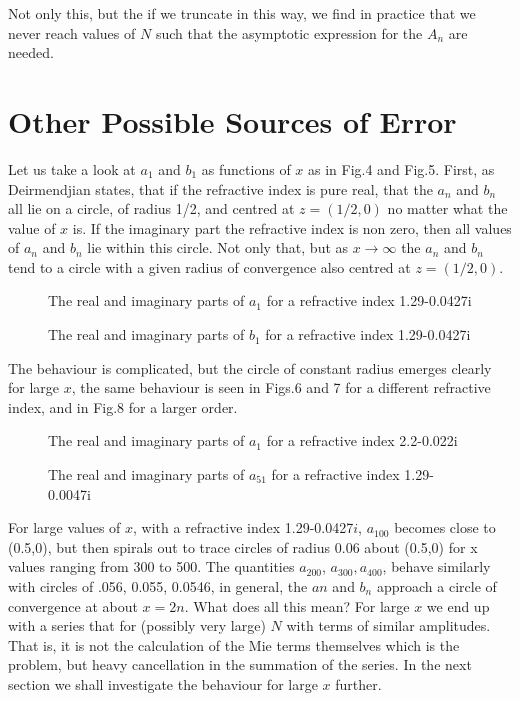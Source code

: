 Not only this, but the if we truncate in this way, we find in practice that we never reach 
values of $N$ such that the asymptotic expression for the $A_n$ are needed.

\section{Other Possible Sources of Error}

Let us take a look at $a_1$ and $b_1$ as functions of $x$ as in Fig.4 and Fig.5.
First, as Deirmendjian states, that if the refractive index is pure real, that
the $a_n$ and $b_n$ all lie on a circle, of radius 1/2, and centred at $z=(1/2,0)$
no matter what the value of $x$ is. If the imaginary part the refractive index is 
non zero, then all values of $a_n$ and $b_n$ lie within this circle. Not only 
that, but as $x \rightarrow \infty$ the $a_n$ and $b_n$ tend to a circle with
a given radius of convergence also centred at $z=(1/2,0)$.

\vspace*{14cm}
\begin{figure}[htb]
\caption{ The real and imaginary parts of $a_1$ for a refractive index 1.29-0.0427i }
\end{figure}
\vspace*{14cm}
\begin{figure}[htb]
\caption{ The real and imaginary parts of $b_1$ for a refractive index 1.29-0.0427i }
\end{figure}
The behaviour is complicated, but the circle of constant radius emerges clearly
for large $x$, the same behaviour is seen in Figs.6 and 7 for a different refractive 
index, and in Fig.8 for a larger order.
\vspace*{14cm}
\begin{figure}[htb]
\caption{ The real and imaginary parts of $a_1$ for a refractive index 2.2-0.022i }
\end{figure}
\vspace*{14cm}
\begin{figure}[htb]
\caption{ The real and imaginary parts of $a_{51}$ for a refractive index 1.29-0.0047i }
\end{figure}

For large values of $x$, with a refractive index 1.29-0.0427$i$, $a_{100}$
 becomes close to (0.5,0), but then spirals out to trace circles of radius 0.06 about (0.5,0) for x values ranging from
 300 to 500. The quantities $a_{200}$, $a_{300}, a_{400}$,  behave similarly
   with circles of .056, 0.055, 0.0546, in general, the $an$ and $b_n$ approach a 
circle of convergence at about $x=2n$.
What does all this mean? For large $x$ we end up with a series that for 
(possibly very large) $N$ with terms of similar amplitudes. That is, it is not the 
calculation of the Mie terms themselves which is the problem, but heavy cancellation
in the summation of the series. In the next section we shall investigate the behaviour for
large $x$ further.

